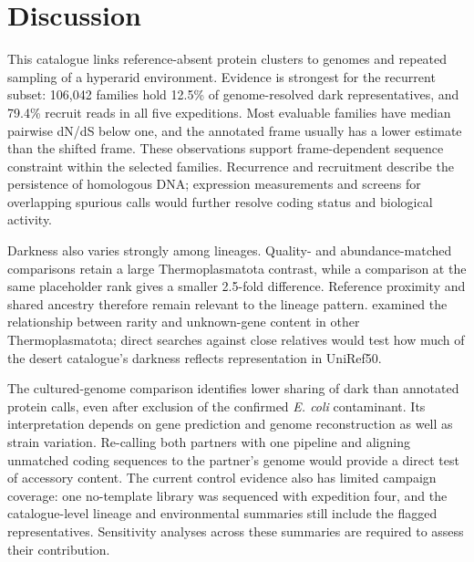 \documentclass[11pt]{article}
\begin{document}
\section*{Discussion}

This catalogue links reference-absent protein clusters to genomes and repeated sampling of a
hyperarid environment. Evidence is strongest for the recurrent subset: 106{,}042 families hold
12.5\% of genome-resolved dark representatives, and 79.4\% recruit reads in all five expeditions.
Most evaluable families have median pairwise dN/dS below one, and the annotated frame usually
has a lower estimate than the shifted frame. These observations support frame-dependent
sequence constraint within the selected families. Recurrence and recruitment describe the
persistence of homologous DNA; expression measurements and screens for overlapping spurious
calls would further resolve coding status and biological activity.

Darkness also varies strongly among lineages. Quality- and abundance-matched comparisons
retain a large Thermoplasmatota contrast, while a comparison at the same placeholder rank gives
a smaller 2.5-fold difference. Reference proximity and shared ancestry therefore remain relevant
to the lineage pattern. \citet{maeke2025thermoplasmatota} examined the relationship between rarity
and unknown-gene content in other Thermoplasmatota; direct searches against close relatives
would test how much of the desert catalogue's darkness reflects representation in UniRef50.

The cultured-genome comparison identifies lower sharing of dark than annotated protein calls,
even after exclusion of the confirmed \emph{E. coli} contaminant. Its interpretation depends on
gene prediction and genome reconstruction as well as strain variation. Re-calling both partners
with one pipeline and aligning unmatched coding sequences to the partner's genome would provide
a direct test of accessory content. The current control evidence also has limited campaign
coverage: one no-template library was sequenced with expedition four, and the catalogue-level
lineage and environmental summaries still include the flagged representatives. Sensitivity
analyses across these summaries are required to assess their contribution.
\end{document}

